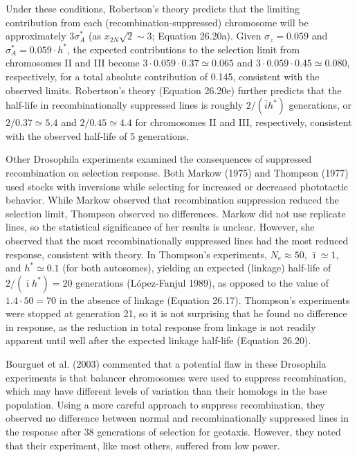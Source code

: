 \documentclass{article}
\begin{document}
{Under these conditions, Robertson’s theory predicts that the limiting contribution from each (recombination-suppressed) chromosome will be approximately  $ 3\sigma_A^* $ (as  $ x_{2N} \sqrt{2} \sim 3 $; Equation 26.20a). Given  $ \sigma_z = 0.059 $ and  $ \sigma_A^* = 0.059 \cdot h^* $, the expected contributions to the selection limit from chromosomes II and III become  $ 3 \cdot 0.059 \cdot 0.37 \simeq 0.065 $ and  $ 3 \cdot 0.059 \cdot 0.45 \simeq 0.080 $, respectively, for a total absolute contribution of 0.145, consistent with the observed limits. Robertson’s theory (Equation 26.20e) further predicts that the half-life in recombinationally suppressed lines is roughly  $ 2 / (\bar{i} h^*) $ generations, or  $ 2 / 0.37 \simeq 5.4 $ and  $ 2 / 0.45 \simeq 4.4 $ for chromosomes II and III, respectively, consistent with the observed half-life of 5 generations.

Other Drosophila experiments examined the consequences of suppressed recombination on selection response. Both Markow (1975) and Thompson (1977) used stocks with inversions while selecting for increased or decreased phototactic behavior. While Markow observed that recombination suppression reduced the selection limit, Thompson observed no differences. Markow did not use replicate lines, so the statistical significance of her results is unclear. However, she observed that the most recombinationally suppressed lines had the most reduced response, consistent with theory. In Thompson's experiments,  $ N_e \approx 50 $,  $ \bar{\imath} \simeq 1 $, and  $ h^* \simeq 0.1 $ (for both autosomes), yielding an expected (linkage) half-life of  $ 2/(\bar{\imath}h^*) = 20 $ generations (López-Fanjul 1989), as opposed to the value of  $ 1.4 \cdot 50 = 70 $ in the absence of linkage (Equation 26.17). Thompson's experiments were stopped at generation 21, so it is not surprising that he found no difference in response, as the reduction in total response from linkage is not readily apparent until well after the expected linkage half-life (Equation 26.20).

Bourguet et al. (2003) commented that a potential flaw in these Drosophila experiments is that balancer chromosomes were used to suppress recombination, which may have different levels of variation than their homologs in the base population. Using a more careful approach to suppress recombination, they observed no difference between normal and recombinationally suppressed lines in the response after 38 generations of selection for geotaxis. However, they noted that their experiment, like most others, suffered from low power.

}
\end{document}
